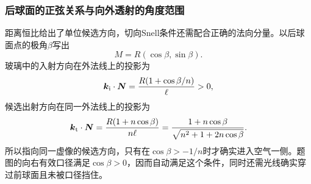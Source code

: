 \documentclass[UTF8,fontset=fandol,a4paper,11pt]{ctexart}
\begin{document}
\subsubsection*{后球面的正弦关系与向外透射的角度范围}
距离恒比给出了单位候选方向，切向Snell条件还需配合正确的法向分量。以后球面点的极角$\beta$写出
\[
M=R(\cos\beta,\sin\beta).
\]
玻璃中的入射方向在外法线上的投影为
\[
\boldsymbol k_{\rm i}\cdot\boldsymbol N
=\frac{R(1+\cos\beta/n)}{\ell}>0,
\]
候选出射方向在同一外法线上的投影为
\[
\boldsymbol k_{\rm t}\cdot\boldsymbol N
=\frac{R(1+n\cos\beta)}{n\ell}
=\frac{1+n\cos\beta}{\sqrt{n^2+1+2n\cos\beta}}.
\]
所以指向同一虚像的候选方向，只有在$\cos\beta>-1/n$时才确实进入空气一侧。题图的向右有效口径满足$\cos\beta>0$，因而自动满足这个条件，同时还需光线确实穿过前球面且未被口径挡住。
\begin{center}\begin{minipage}{.97\linewidth}\centering
{}
\end{minipage}
\end{center}
\end{document}
